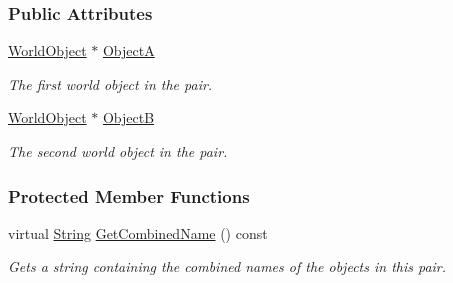 \subsubsection*{Public Attributes}
\begin{DoxyCompactItemize}
\item 
\hypertarget{classMezzanine_1_1ObjectPair_ac3e791690963a9dba54f4e7a049910e4}{
\hyperlink{classMezzanine_1_1WorldObject}{WorldObject} $\ast$ \hyperlink{classMezzanine_1_1ObjectPair_ac3e791690963a9dba54f4e7a049910e4}{ObjectA}}
\label{classMezzanine_1_1ObjectPair_ac3e791690963a9dba54f4e7a049910e4}

\begin{DoxyCompactList}\small\item\em The first world object in the pair. \item\end{DoxyCompactList}\item 
\hypertarget{classMezzanine_1_1ObjectPair_a074870bdbbeb405fec6090f30e59af28}{
\hyperlink{classMezzanine_1_1WorldObject}{WorldObject} $\ast$ \hyperlink{classMezzanine_1_1ObjectPair_a074870bdbbeb405fec6090f30e59af28}{ObjectB}}
\label{classMezzanine_1_1ObjectPair_a074870bdbbeb405fec6090f30e59af28}

\begin{DoxyCompactList}\small\item\em The second world object in the pair. \item\end{DoxyCompactList}\end{DoxyCompactItemize}
\subsubsection*{Protected Member Functions}
\begin{DoxyCompactItemize}
\item 
\hypertarget{classMezzanine_1_1ObjectPair_aebdf46a30a933a68b90c37dfc12e84ae}{
virtual \hyperlink{namespaceMezzanine_acf9fcc130e6ebf08e3d8491aebcf1c86}{String} \hyperlink{classMezzanine_1_1ObjectPair_aebdf46a30a933a68b90c37dfc12e84ae}{GetCombinedName} () const }
\label{classMezzanine_1_1ObjectPair_aebdf46a30a933a68b90c37dfc12e84ae}

\begin{DoxyCompactList}\small\item\em Gets a string containing the combined names of the objects in this pair. \item\end{DoxyCompactList}\end{DoxyCompactItemize}


